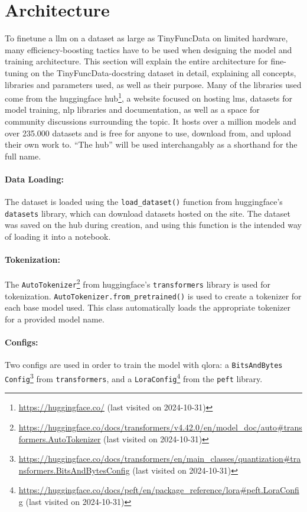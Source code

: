 \section{Architecture}
\label{sec:architecture}

To finetune a \ac{llm} on a dataset as large as TinyFuncData on limited hardware, many efficiency-boosting tactics have to be used when designing the model and training architecture.
This section will explain the entire architecture for fine-tuning on the TinyFuncData-docstring dataset in detail, explaining all concepts, libraries and parameters used, as well as their purpose.
Many of the libraries used come from the huggingface hub\footnote{\url{https://huggingface.co/} (last visited on 2024-10-31)}, a website focused on hosting \acp{lm}, datasets for model training, \ac{nlp} libraries and documentation, as well as a space for community discussions surrounding the topic.
It hosts over a million models and over 235.000 datasets and is free for anyone to use, download from, and upload their own work to.
\enquote{The hub} will be used interchangably as a shorthand for the full name.

\paragraph{Data Loading:}
The dataset is loaded using the \texttt{load\_dataset()} function from huggingface's \texttt{datasets} library, which can download datasets hosted on the site.
The dataset was saved on the hub during creation, and using this function is the intended way of loading it into a notebook.


\paragraph{Tokenization:}
The \texttt{AutoTokenizer}\footnote{\url{https://huggingface.co/docs/transformers/v4.42.0/en/model_doc/auto\#transformers.AutoTokenizer} (last visited on 2024-10-31)} from huggingface's \texttt{transformers} library is used for tokenization.
\texttt{AutoTokenizer.from\_pretrained()} is used to create a tokenizer for each base model used.
This class automatically loads the appropriate tokenizer for a provided model name.

\paragraph{Configs:}
Two configs are used in order to train the model with \ac{qlora}:
a \texttt{BitsAndBytes\\Config}\footnote{\url{https://huggingface.co/docs/transformers/en/main_classes/quantization\#transformers.BitsAndBytesConfig} (last visited on 2024-10-31)} from \texttt{transformers}, and a \texttt{LoraConfig}\footnote{\url{https://huggingface.co/docs/peft/en/package_reference/lora\#peft.LoraConfig} (last visited on 2024-10-31)} from the \texttt{peft} library.


